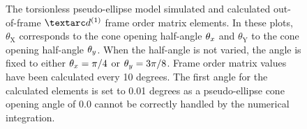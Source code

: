 \begin{figure}
\begin{tabular}{@{}cc@{}}
  \end{tabular}
  \caption[Torsionless pseudo-ellipse simulated and calculated out-of-frame Daeg$^{(1)}$ elements.]{
    The torsionless pseudo-ellipse model simulated and calculated out-of-frame $\FOone$ frame order matrix elements.
    In these plots, $\theta_\textrm{X}$ corresponds to the cone opening half-angle $\theta_x$ and $\theta_\textrm{Y}$ to the cone opening half-angle $\theta_y$.
    When the half-angle is not varied, the angle is fixed to either $\theta_x = \pi/4$ or $\theta_y = 3\pi/8$.
    Frame order matrix values have been calculated every 10 degrees.
    The first angle for the calculated elements is set to 0.01 degrees as a pseudo-ellipse cone opening angle of 0.0 cannot be correctly handled by the numerical integration.
  }
  \label{fig: simulated and calculated out-of-frame 1st degree pseudo-ellipse, torsionless frame order}
\end{figure}

